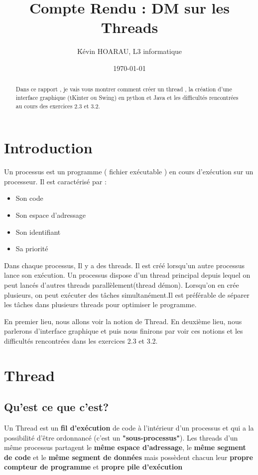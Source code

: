 \documentclass{article}
\title{Compte Rendu : DM sur les Threads}
\author{\'Kévin HOARAU, L3 informatique}
\date{\today}
\begin{document}
\maketitle %


\begin{abstract}
  Dans ce rapport , je vais vous montrer comment créer un thread , la création d'une interface graphique (tKinter ou Swing) en python et Java et les difficultés rencontrées au cours des exercices 2.3 et 3.2.
\end{abstract}

\section{Introduction}
\label{section:hello} %

Un processus est un programme ( fichier exécutable ) en cours d'exécution sur un processeur.
Il est caractérisé par :
\begin{itemize}
\item Son code
\item Son espace d'adressage
\item Son identifiant
\item Sa priorité 
\end{itemize}
Dans chaque processus, Il y a  des threads. Il est créé lorsqu'un autre processus lance son exécution. Un processus dispose d’un thread principal depuis lequel on peut lancés d’autres threads parallèlement(thread démon).
Lorsqu'on en crée plusieurs, on peut exécuter des tâches simultanément.Il est préférable de séparer les tâches dans plusieurs threads pour optimiser le programme.


En premier lieu, nous allons voir la notion de Thread. En deuxième lieu, nous parlerons d'interface graphique et puis nous finirons par voir ces notions et les difficultés rencontrées dans les exercices 2.3 et 3.2.

 
\section{Thread}
\subsection{Qu'est ce que c'est?}

Un Thread est un \textbf {fil d'exécution} de code à l'intérieur d'un processus et qui a la possibilité d'être ordonnancé (c'est un \textbf {"sous-processus"}).
	Les threads d'un même processus partagent le \textbf{même espace d'adressage}, le \textbf{même segment de code} et le \textbf{même segment de données} mais possèdent chacun leur \textbf{propre compteur de programme} et \textbf{ propre pile d'exécution}
 
\end{document}
